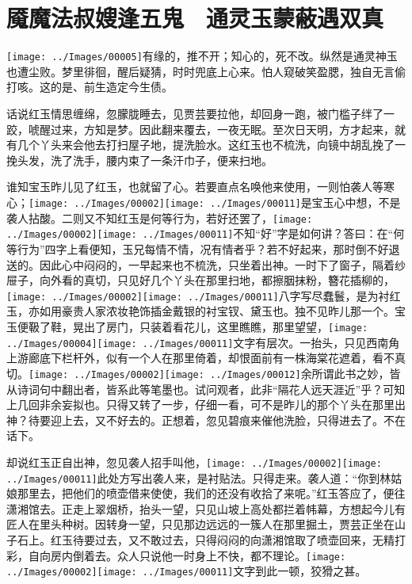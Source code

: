 

\chapter{魇魔法叔嫂逢五鬼　通灵玉蒙蔽遇双真}\label{part0029_split_000.htmlux5cux23calibre_pb_0}

{\texttt{[image: ../Images/00005]}有缘的，推不开；知心的，死不改。纵然是通灵神玉也遭尘败。梦里徘徊，醒后疑猜，时时兜底上心来。怕人窥破笑盈腮，独自无言偷打咳。这的是、前生造定今生债。}

话说红玉情思缠绵，忽朦胧睡去，见贾芸要拉他，却回身一跑，被门槛子绊了一跤，唬醒过来，方知是梦。因此翻来覆去，一夜无眠。至次日天明，方才起来，就有几个丫头来会他去打扫屋子地，提洗脸水。这红玉也不梳洗，向镜中胡乱挽了一挽头发，洗了洗手，腰内束了一条汗巾子，便来扫地。

谁知宝玉昨儿见了红玉，也就留了心。若要直点名唤他来使用，一则怕袭人等寒心；{\texttt{[image: ../Images/00002]}\texttt{[image: ../Images/00011]}\footnotesize \kaishu 是宝玉心中想，不是袭人拈酸。}二则又不知红玉是何等行为，若好还罢了，{\texttt{[image: ../Images/00002]}\texttt{[image: ../Images/00011]}\footnotesize \kaishu 不知``好''字是如何讲？答曰：在``何等行为''四字上看便知，玉兄每情不情，况有情者乎？}若不好起来，那时倒不好退送的。因此心中闷闷的，一早起来也不梳洗，只坐着出神。一时下了窗子，隔着纱屉子，向外看的真切，只见好几个丫头在那里扫地，都擦胭抹粉，簪花插柳的，{\texttt{[image: ../Images/00002]}\texttt{[image: ../Images/00011]}\footnotesize \kaishu 八字写尽蠢鬟，是为衬红玉，亦如用豪贵人家浓妆艳饰插金戴银的衬宝钗、黛玉也。}独不见昨儿那一个。宝玉便靸了鞋，晃出了房门，只装着看花儿，这里瞧瞧，那里望望，{\texttt{[image: ../Images/00004]}\texttt{[image: ../Images/00011]}\footnotesize \kaishu 文字有层次。}一抬头，只见西南角上游廊底下栏杆外，似有一个人在那里倚着，却恨面前有一株海棠花遮着，看不真切。{\texttt{[image: ../Images/00002]}\texttt{[image: ../Images/00012]}\footnotesize \kaishu 余所谓此书之妙，皆从诗词句中翻出者，皆系此等笔墨也。试问观者，此非``隔花人远天涯近''乎？可知上几回非余妄拟也。}只得又转了一步，仔细一看，可不是昨儿的那个丫头在那里出神？待要迎上去，又不好去的。正想着，忽见碧痕来催他洗脸，只得进去了。不在话下。

却说红玉正自出神，忽见袭人招手叫他，{\texttt{[image: ../Images/00002]}\texttt{[image: ../Images/00011]}\footnotesize \kaishu 此处方写出袭人来，是衬贴法。}只得走来。袭人道：``你到林姑娘那里去，把他们的喷壶借来使使，我们的还没有收拾了来呢。''红玉答应了，便往潇湘馆去。正走上翠烟桥，抬头一望，只见山坡上高处都拦着帏幕，方想起今儿有匠人在里头种树。因转身一望，只见那边远远的一簇人在那里掘土，贾芸正坐在山子石上。红玉待要过去，又不敢过去，只得闷闷的向潇湘馆取了喷壶回来，无精打彩，自向房内倒着去。众人只说他一时身上不快，都不理论。{\texttt{[image: ../Images/00002]}\texttt{[image: ../Images/00011]}\footnotesize \kaishu 文字到此一顿，狡猾之甚。}

